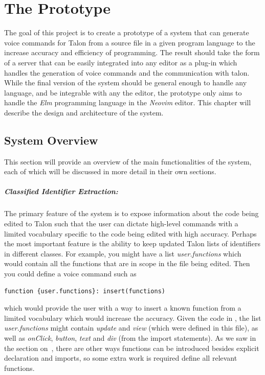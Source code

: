 \documentclass[../thesis.tex]{subfiles}
\begin{document}
\chapter{The Prototype}\label{the_project}
The goal of this project is to create a prototype of a system that can generate voice commands
for Talon from a source file in a given program language to the increase accuracy and efficiency of programming.
The result should take the form of a server that can be easily integrated into any editor as a plug-in
which handles the generation of voice commands and the communication with talon.
While the final version of the system should be general enough to handle any language, and be integrable with any the editor,
the prototype only aims to handle the \textit{Elm} programming language in the \textit{Neovim} editor.
This chapter will describe the design and architecture of the system.

\section{System Overview}%
\label{sec:voice_command_generation}
This section will provide an overview of the main functionalities of the system,
each of which will be discussed in more detail in their own sections.

\paragraph{Classified Identifier Extraction:}%
\label{par:classified_identifier_extraction}
The primary feature of the system is to expose information about the code being edited
to Talon such that the user can dictate high-level commands with a limited vocabulary
specific to the code being edited with high accuracy.
Perhaps the most important feature is the ability to keep updated Talon lists
of identifiers in different classes. For example, you might have a list \textit{user.functions} which would contain
all the functions that are in scope in the file being edited.
Then you could define a voice command such as 
\begin{verbatim}
function {user.functions}: insert(functions)
\end{verbatim} 
which would provide the user with a way to insert a known function from a limited vocabulary which would increase the accuracy.
Given the code in , the list \textit{user.functions} might contain \textit{update} and \textit{view}
(which were defined in this file), as well as \textit{onClick}, \textit{button}, \textit{text} and \textit{div} (from the import statements).
As we saw in the section on~, there are other ways functions can be introduced
besides explicit declaration and imports, so some extra work is required define all relevant functions.
\end{document}
